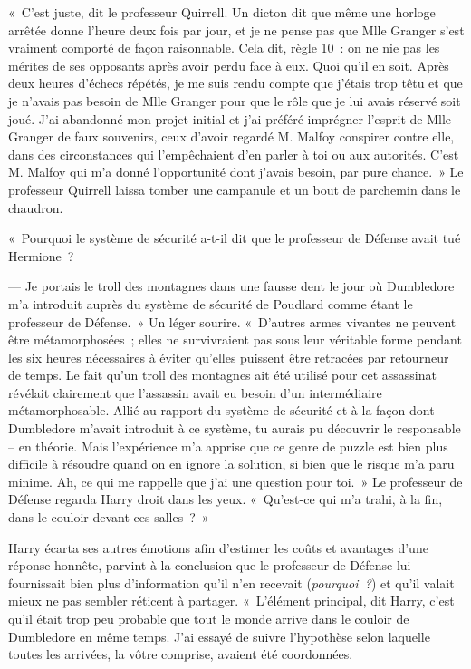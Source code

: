 «~C'est juste, dit le professeur Quirrell. Un dicton dit que même une horloge arrêtée donne l'heure deux fois par jour, et je ne pense pas que Mlle Granger s'est vraiment comporté de façon raisonnable. Cela dit, règle 10~: on ne nie pas les mérites de ses opposants après avoir perdu face à eux. Quoi qu'il en soit. Après deux heures d'échecs répétés, je me suis rendu compte que j'étais trop têtu et que je n'avais pas besoin de Mlle Granger pour que le rôle que je lui avais réservé soit joué. J'ai abandonné mon projet initial et j'ai préféré imprégner l'esprit de Mlle Granger de faux souvenirs, ceux d'avoir regardé M. Malfoy conspirer contre elle, dans des circonstances qui l'empêchaient d'en parler à toi ou aux autorités. C'est M. Malfoy qui m'a donné l'opportunité dont j'avais besoin, par pure chance.~» Le professeur Quirrell laissa tomber une campanule et un bout de parchemin dans le chaudron.

«~Pourquoi le système de sécurité a-t-il dit que le professeur de Défense avait tué Hermione~?

--- Je portais le troll des montagnes dans une fausse dent le jour où Dumbledore m'a introduit auprès du système de sécurité de Poudlard comme étant le professeur de Défense.~» Un léger sourire. «~D'autres armes vivantes ne peuvent être métamorphosées~; elles ne survivraient pas sous leur véritable forme pendant les six heures nécessaires à éviter qu'elles puissent être retracées par retourneur de temps. Le fait qu'un troll des montagnes ait été utilisé pour cet assassinat révélait clairement que l'assassin avait eu besoin d'un intermédiaire métamorphosable. Allié au rapport du système de sécurité et à la façon dont Dumbledore m'avait introduit à ce système, tu aurais pu découvrir le responsable -- en théorie. Mais l'expérience m'a apprise que ce genre de puzzle est bien plus difficile à résoudre quand on en ignore la solution, si bien que le risque m'a paru minime. Ah, ce qui me rappelle que j'ai une question pour toi.~» Le professeur de Défense regarda Harry droit dans les yeux. «~Qu'est-ce qui m'a trahi, à la fin, dans le couloir devant ces salles~?~»

Harry écarta ses autres émotions afin d'estimer les coûts et avantages d'une réponse honnête, parvint à la conclusion que le professeur de Défense lui fournissait bien plus d'information qu'il n'en recevait (\emph{pourquoi~?}) et qu'il valait mieux ne pas sembler réticent à partager. «~L'élément principal, dit Harry, c'est qu'il était trop peu probable que tout le monde arrive dans le couloir de Dumbledore en même temps. J'ai essayé de suivre l'hypothèse selon laquelle toutes les arrivées, la vôtre comprise, avaient été coordonnées.

